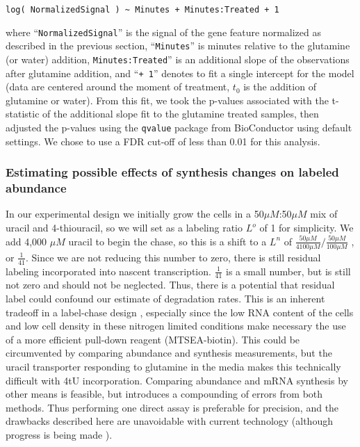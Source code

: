 \begin{verbatim}
log( NormalizedSignal ) ~ Minutes + Minutes:Treated + 1
\end{verbatim}

where ``\texttt{NormalizedSignal}'' is the signal of the gene feature
normalized as described in the previous section, ``\texttt{Minutes}'' is
minutes relative to the glutamine (or water) addition,
\texttt{Minutes:Treated}'' is an additional slope of the observations
after glutamine addition, and ``\texttt{+\ 1}'' denotes to fit a single
intercept for the model (data are centered around the moment of 
treatment, $t_0$ is the addition of glutamine or water). 
From this fit, we took the p-values associated
with the t-statistic of the additional slope fit to the glutamine
treated samples, then adjusted the p-values using the \texttt{qvalue}
package from BioConductor using default settings. We chose to use a FDR
cut-off of less than 0.01 for this analysis.

\subsubsection{Estimating possible effects of synthesis changes on
labeled
abundance}\label{estimating-possible-effects-of-synthesis-changes-on-labeled-abundance}

In our experimental design we initially grow the cells in a
50\(\mu M\):50\(\mu M\) mix of uracil and 4-thiouracil, so we will set
as a labeling ratio \(L^o\) of 1 for simplicity. We add 4,000 \(\mu M\)
uracil to begin the chase, so this is a shift to a \(L^n\) of
\(\frac{50 \mu M}{4100 \mu M} / \frac{50 \mu M}{100 \mu M}\) , or
\(\frac{1}{41}\). Since we are not reducing this number to zero, there
is still residual labeling incorporated into nascent transcription.
\(\frac{1}{41}\) is a small number, but is still not zero and should
not be neglected.
Thus, there is a potential that residual label could confound our
estimate of degradation rates. This is an inherent tradeoff in a
label-chase design \parencite{perez2013eukaryotic}, 
especially since the low RNA content of the cells
and low cell density in these nitrogen limited conditions make necessary
the use of a more efficient pull-down reagent (MTSEA-biotin). This could
be circumvented by comparing abundance and synthesis measurements, but
the uracil transporter responding to glutamine in the media makes this
technically difficult with 4tU incorporation. Comparing abundance and
mRNA synthesis by other means is feasible, but introduces a compounding
of errors from both methods. Thus performing one direct assay is
preferable for precision, and the drawbacks described here are
unavoidable with current technology (although progress is being made
\cite{chan2017non}).

